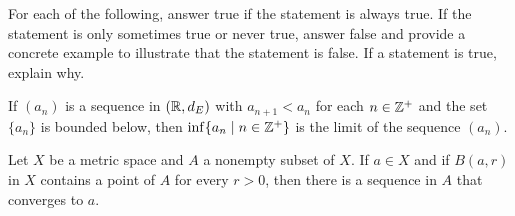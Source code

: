 \begin{comment}

\ExerciseSolution
\ba

\item Let $\epsilon$ be a positive number. We can assume that $\epsilon$ is also less than $1$. Note that $\ln(\epsilon) < 0$ and $\ln(a) < 0$. Let $N \in \Z^+$ such that $N > \frac{\ln(\epsilon)}{\ln(a)}$. Then if $n \geq N$ we have 
\begin{align*}
n &> \frac{\ln(\epsilon)}{\ln(a)} \\
n \ln(a) &< \ln(\epsilon) \\
\ln\left(a^n\right) &< \ln(\epsilon) \\
a^n &< \epsilon \\
\left|a^n - 0\right| &< \epsilon.
\end{align*}
So the sequence $\left(a^n\right)$ converges to $0$ for any $0 \leq a < 1$. 

\item We will show that the sequence $(f_n)$ does not converge to $f$. Since $x^n$ is an increasing function of $x$, it follows that 
\[\sup\{\left|x^n-0\right| \mid 0 \leq x < 1\} = 1.\]
So there is no way that $d(f_n,f)$ can be less than $\epsilon$ if $\epsilon < 1$. 

\item We will how that the sequence $(f_n)$ converges to the $0$ function in $C[0,1]$. Note that 
\[d(f_n,0) = \int_0^1 |x^n - 0| \, dx = \frac{x^{n+1}{n+1}}\biggm|_0^1 = \frac{1}{n+1}.\]
As $n$ goes to infinity, $\frac{1}{n+1}$ converges to $0$. So $\lim (f_n)$ is the zero function. 

\ea

\end{comment}

\item For each of the following, answer true if the statement is always true. If the statement is only sometimes true or never true, answer false and provide a concrete example to illustrate that the statement is false. If a statement is true, explain why.  

	\ba
	\item If $(a_n)$ is a sequence in $(\mathbb{R}, d_E)$ with $a_{n+1} < a_n$ for each $n \in \mathbb{Z}^+$ and the set $\{a_n\}$ is bounded below, then $\inf \{a_n \mid n \in \mathbb{Z}^+\}$ is the limit of the sequence $(a_n)$. 
	
	\item Let $X$ be a metric space and $A$ a nonempty subset of $X$. If $a \in X$ and if $B(a,r)$ in $X$ contains a point of $A$ for every $r > 0$, then there is a sequence in $A$ that converges to $a$. 
	

